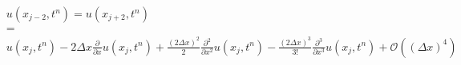 \documentclass[a4paper,11pt]{article}
\begin{document}
\begin{equation*}
    \begin{array}{rcl}
        & u(x_{j-2}, t^{n}) = u(x_{j+2}, t^{n}) & \\
        &=& \\
        & u(x_{j}, t^{n})
         - 2\Delta x \frac{\partial}{\partial x}u(x_{j}, t^{n})
         + \frac{(2\Delta x)^{2}}{2} \frac{\partial^{2}}{\partial x^{2}}u(x_{j}, t^{n})
         - \frac{(2\Delta x)^{3}}{3!} \frac{\partial^{3}}{\partial x^{3}}u(x_{j}, t^{n})
         + \mathcal{O}((\Delta x)^{4}) &
    \end{array}
\end{equation*}
\end{document}
